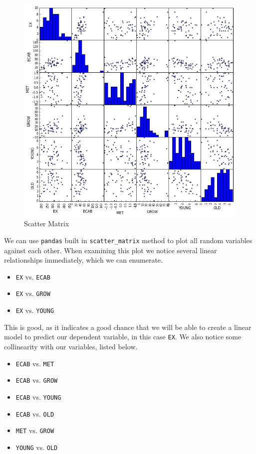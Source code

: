 \documentclass[10pt]{article}\usepackage[]{graphicx}\usepackage[]{xcolor}
\begin{document}
    \begin{figure}[H]
        \centering
        \includegraphics[scale=0.6]{./img/scatter_matrix.png}
        \caption{Scatter Matrix}
        \label{fig:scatter_matrix}
    \end{figure}
    
    We can use \texttt{pandas} built in \texttt{scatter\_matrix} method to plot all random variables against each other.
    When examining this plot we notice several linear relationships immediately, which we can enumerate.

\begin{itemize}
\itemsep1pt\parskip0pt
\item
  \texttt{EX} vs. \texttt{ECAB}
\item
  \texttt{EX} vs. \texttt{GROW}
\item
  \texttt{EX} vs. \texttt{YOUNG}
\end{itemize}

This is good, as it indicates a good chance that we will be able to create a linear model to predict our dependent
variable, in this case \texttt{EX}.  We also notice some collinearity with our variables, listed below.

\begin{itemize}
\itemsep1pt\parskip0pt
\item
  \texttt{ECAB} vs. \texttt{MET}
\item
  \texttt{ECAB} vs. \texttt{GROW}
\item
  \texttt{ECAB} vs. \texttt{YOUNG}
\item
  \texttt{ECAB} vs. \texttt{OLD}
\item
  \texttt{MET} vs. \texttt{GROW}
\item
  \texttt{YOUNG} vs. \texttt{OLD}
\end{itemize}
\end{document}
